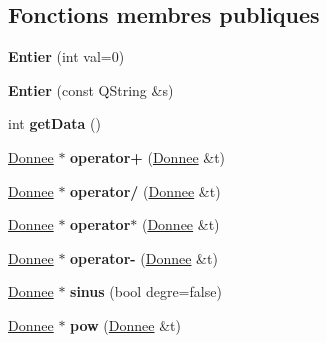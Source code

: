 \subsection*{Fonctions membres publiques}
\begin{DoxyCompactItemize}
\item 
\hypertarget{class_entier_ab7343e7337fe0f74b26a370bd60e83fd}{{\bfseries Entier} (int val=0)}\label{class_entier_ab7343e7337fe0f74b26a370bd60e83fd}

\item 
\hypertarget{class_entier_afbd6f3cad81d75a4cb2fb142dcded828}{{\bfseries Entier} (const Q\-String \&s)}\label{class_entier_afbd6f3cad81d75a4cb2fb142dcded828}

\item 
\hypertarget{class_entier_a06090bab3375f1adba393192b7c87dec}{int {\bfseries get\-Data} ()}\label{class_entier_a06090bab3375f1adba393192b7c87dec}

\item 
\hypertarget{class_entier_ad70191b038f04dd46cf3c053d2b5428b}{\hyperlink{class_donnee}{Donnee} $\ast$ {\bfseries operator+} (\hyperlink{class_donnee}{Donnee} \&t)}\label{class_entier_ad70191b038f04dd46cf3c053d2b5428b}

\item 
\hypertarget{class_entier_a694ea4709a6e40c153069afb6b0bac33}{\hyperlink{class_donnee}{Donnee} $\ast$ {\bfseries operator/} (\hyperlink{class_donnee}{Donnee} \&t)}\label{class_entier_a694ea4709a6e40c153069afb6b0bac33}

\item 
\hypertarget{class_entier_a3ed8817d4078a4b792411bf0eb7642e7}{\hyperlink{class_donnee}{Donnee} $\ast$ {\bfseries operator$\ast$} (\hyperlink{class_donnee}{Donnee} \&t)}\label{class_entier_a3ed8817d4078a4b792411bf0eb7642e7}

\item 
\hypertarget{class_entier_a2f4322a6fbb75553b336521e492ee6ab}{\hyperlink{class_donnee}{Donnee} $\ast$ {\bfseries operator-\/} (\hyperlink{class_donnee}{Donnee} \&t)}\label{class_entier_a2f4322a6fbb75553b336521e492ee6ab}

\item 
\hypertarget{class_entier_a224f6a3c7982553c5e98870bb5ed2275}{\hyperlink{class_donnee}{Donnee} $\ast$ {\bfseries sinus} (bool degre=false)}\label{class_entier_a224f6a3c7982553c5e98870bb5ed2275}

\item 
\hypertarget{class_entier_a5931ccf5eb67467ab08148279f631aa5}{\hyperlink{class_donnee}{Donnee} $\ast$ {\bfseries pow} (\hyperlink{class_donnee}{Donnee} \&t)}\label{class_entier_a5931ccf5eb67467ab08148279f631aa5}


\end{DoxyCompactItemize}
